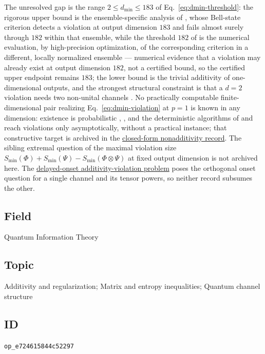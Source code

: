 The unresolved gap is the range $2\leq d_{\min}\leq183$ of
Eq.~\eqref{eq:dmin-threshold}: the rigorous upper bound is the
ensemble-specific analysis of , whose
Bell-state criterion detects a violation at output dimension $183$ and fails
almost surely through $182$ within that ensemble, while the threshold $182$
of  is the numerical evaluation, by
high-precision optimization, of the corresponding criterion in a different,
locally normalized ensemble --- numerical evidence that a violation may
already exist at output dimension $182$, not a certified bound, so the
certified upper endpoint remains $183$; the lower bound is the trivial
additivity of one-dimensional outputs, and the strongest structural
constraint is that a $d=2$ violation needs two non-unital channels
.  No practically computable
finite-dimensional pair realizing Eq.~\eqref{eq:dmin-violation} at $p=1$ is
known in any dimension: existence is probabilistic
, ,
and the deterministic algorithms of  and
 reach violations only asymptotically,
without a practical instance; that constructive target is archived in the
\href{https://qiqc-op.com/problem/op_25e23d6e92ebce9d/}{closed-form nonadditivity record}.  The sibling extremal question of the
maximal violation size
$S_{\min}(\Phi)+S_{\min}(\Psi)-S_{\min}(\Phi\otimes\Psi)$ at fixed output
dimension is not archived here.  The \href{https://qiqc-op.com/problem/op_c0b1045a614d2353/}{delayed-onset additivity-violation problem} poses the orthogonal onset question for a single channel and its
tensor powers, so neither record subsumes the other.

\subsection*{Field}

Quantum Information Theory

\subsection*{Topic}

Additivity and regularization; Matrix and entropy inequalities; Quantum channel structure

\subsection*{ID}

\texttt{op\_e724615844c52297}
